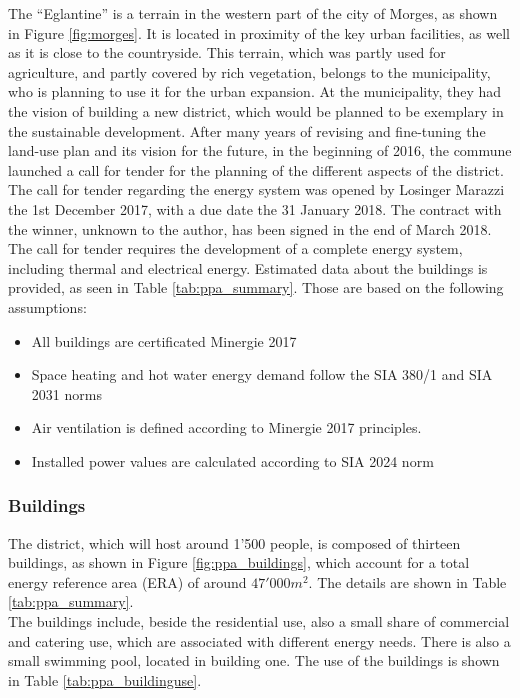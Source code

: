 \documentclass{article}
\begin{document}
The “Eglantine” is a terrain in the western part of the city of Morges, as shown in Figure \ref{fig:morges}. It is located in proximity of the key urban facilities, as well as it is close to the countryside. This terrain, which was partly used for agriculture, and partly covered by rich vegetation, belongs to the municipality, who is planning to use it for the urban expansion. At the municipality, they had the vision of building a new district, which would be planned to be exemplary in the sustainable development. After many years of revising and fine-tuning the land-use plan and its vision for the future, in the beginning of 2016, the commune launched a call for tender for the planning of the different aspects of the district. The call for tender regarding the energy system was opened by Losinger Marazzi the 1st December 2017, with a due date the 31 January 2018. The contract with the winner, unknown to the author, has been signed in the end of March 2018. \\

The call for tender requires the development of a complete energy system, including thermal and electrical energy. Estimated data about the buildings is provided, as seen in Table \ref{tab:ppa_summary}. Those are based on the following assumptions:
\begin{itemize}
    \item All buildings are certificated Minergie 2017
    \item Space heating and hot water energy demand follow the SIA 380/1 and SIA 2031 norms
    \item Air ventilation is defined according to Minergie 2017 principles.
    \item Installed power values are calculated according to SIA 2024 norm
\end{itemize}

\subsubsection{Buildings}
The district, which will host around 1'500 people, is composed of thirteen buildings, as shown in Figure \ref{fig:ppa_buildings}, which account for a total energy reference area (ERA) of around $47'000 m^{2}$. The details are shown in Table \ref{tab:ppa_summary}.\\
The buildings include, beside the residential use, also a small share of commercial and catering use, which are associated with different energy needs. There is also a small swimming pool, located in building one. The use of the buildings is shown in Table \ref{tab:ppa_buildinguse}.
\end{document}
